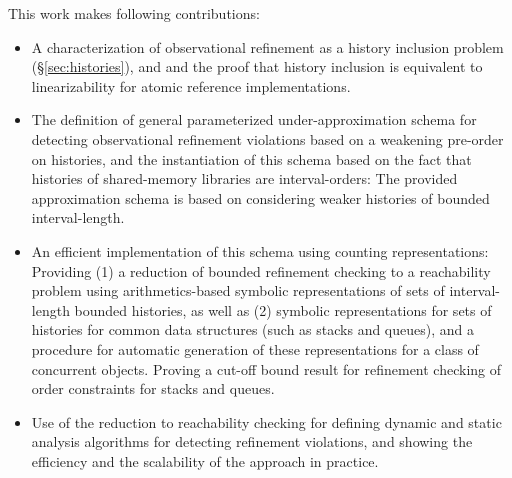 This work makes following contributions:
\begin{itemize}

  \item A characterization of observational refinement as a history inclusion
  problem (\S\ref{sec:histories}), and 
and the proof that history inclusion is
  equivalent to linearizability for atomic reference implementations.

  \item The definition of general parameterized under-approximation schema for
  detecting observational refinement violations based on a weakening pre-order
  on histories, and the instantiation of this schema based on the fact that
  histories of shared-memory libraries are interval-orders: The provided
  approximation schema is based on considering weaker histories of bounded
  interval-length.

  \item An efficient implementation of this schema using counting
  representations: Providing (1) a reduction of bounded refinement checking to
  a reachability problem using arithmetics-based symbolic representations of
  sets of interval-length bounded histories, as well as (2) symbolic
  representations for sets of histories for common data structures (such as
  stacks and queues), and a procedure for automatic generation of these
  representations for a class of concurrent objects. Proving a cut-off bound
  result for refinement checking of order constraints for stacks and queues.

  \item Use of the reduction to reachability checking for defining dynamic and
  static analysis algorithms for detecting refinement violations, and showing
  the efficiency and the scalability of the approach in practice.

\end{itemize}
